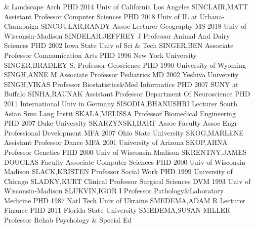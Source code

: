 \documentclass[
]{article}
\begin{document}
\& Landscape Arch \textbar PHD 2014 Univ of California Los Angeles
\textbar SINCLAIR,MATT \textbar Assistant Professor \textbar{}
 \textbar Computer Sciences \textbar PHD 2018 Univ of IL at
Urbana-Champaign \textbar SINCOULAR,RANDY \textbar Assoc Lecturer
\textbar{}  \textbar Geography \textbar MS 2018 Univ of
Wisconsin-Madison \textbar SINDELAR,JEFFREY J \textbar Professor
\textbar{}  \textbar Animal And Dairy Sciences \textbar PHD
2002 Iowa State Univ of Sci \& Tech \textbar SINGER,BEN
\textbar Associate Professor \textbar{} 
\textbar Communication Arts \textbar PHD 1996 New York University
\textbar SINGER,BRADLEY S. \textbar Professor \textbar{} 
\textbar Geoscience \textbar PHD 1990 University of Wyoming
\textbar SINGH,ANNE M \textbar Associate Professor \textbar{}
 \textbar Pediatrics \textbar MD 2002 Yeshiva University
\textbar SINGH,VIKAS \textbar Professor \textbar{} 
\textbar Biostatistics\&Med Informatics \textbar PHD 2007 SUNY at
Buffalo \textbar SINHA,RAUNAK \textbar Assistant Professor \textbar{}
 \textbar Department Of Neuroscience \textbar PHD 2011
International Univ in Germany \textbar SISODIA,BHANUSHRI
\textbar Lecturer \textbar{}  \textbar South Asian Sum Lang
Instit \textbar SKALA,MELISSA \textbar Professor \textbar Biomedical
Engineering \textbar{}  \textbar PHD 2007 Duke University
\textbar SKARZYNSKI,BART \textbar Assoc Faculty Assoc \textbar Engr
Professional Development \textbar{}  \textbar MFA 2007 Ohio
State University \textbar SKOG,MARLENE \textbar Assistant Professor
\textbar Dance \textbar{}  \textbar MFA 2001 University of
Arizona \textbar SKOP,AHNA \textbar Professor \textbar Genetics
\textbar{}  \textbar PHD 2000 Univ of Wisconsin-Madison
\textbar SKRENTNY,JAMES DOUGLAS \textbar Faculty Associate
\textbar Computer Sciences \textbar{}  \textbar PHD 2000
Univ of Wisconsin-Madison \textbar SLACK,KRISTEN \textbar Professor
\textbar Social Work \textbar{}  \textbar PHD 1999
University of Chicago \textbar SLADKY,KURT \textbar Clinical Professor
\textbar Surgical Sciences \textbar{}  \textbar DVM 1993
Univ of Wisconsin-Madison \textbar SLUKVIN,IGOR I \textbar Professor
\textbar Pathology\&Laboratory Medicine \textbar{} 
\textbar PHD 1987 Natl Tech Univ of Ukraine \textbar SMEDEMA,ADAM R
\textbar Lecturer \textbar Finance \textbar{}  \textbar PHD
2011 Florida State University \textbar SMEDEMA,SUSAN MILLER
\textbar Professor \textbar Rehab Psychology \& Special Ed \textbar{}
\end{document}
